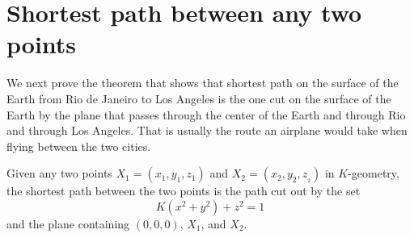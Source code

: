 \documentclass{ximera}
\begin{document}
\section{Shortest path between any two points}

We next prove the theorem that shows that shortest path on the surface
of the Earth from Rio de Janeiro to Los Angeles is the one cut on the
surface of the Earth by the plane that passes through the center of
the Earth and through Rio and through Los Angeles. That is usually the
route an airplane would take when flying between the two cities.


\begin{theorem}
Given any two points $X_{1}=\left(x_{1},y_{1},z_{1}\right) $ and
$X_{2}=\left(x_{2},y_{2},z_{_{2}}\right) $ in $K$-geometry, the
shortest path between the two points is the path cut out by the set
\[
K\left(  x^{2}+y^{2}\right)  +z^{2}=1
\]
and the plane containing $(0,0,0)$, $X_{1}$, and $X_{2}$.
\end{theorem}
\end{document}
